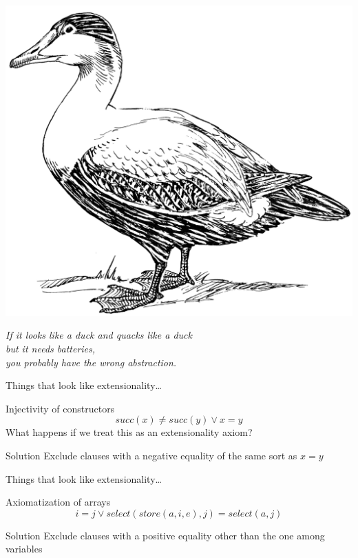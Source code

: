 \begin{frame}
  \begin{center}
    \includegraphics[width=.25\textwidth]{duck}
    
    \textit{If it looks like a duck and quacks like a duck\\ but it needs
    batteries,\\you probably have the wrong abstraction.}
  \end{center}
\end{frame}

\begin{frame}{Things that look like extensionality\dots}
  \begin{block}{Injectivity of constructors}
    \[
    succ(x) \neq succ(y) \lor x = y
    \]
    What happens if we treat this as an extensionality axiom?
  \end{block}
  
  \begin{block}{Solution}
    Exclude clauses with a negative equality of the same sort as $x = y$
  \end{block}
\end{frame}

\begin{frame}{Things that look like extensionality\dots}
  \begin{block}{Axiomatization of arrays}
    \[
    i = j \lor select(store(a,i,e), j) = select(a, j)
    \]
  \end{block}

  \begin{block}{Solution}
    Exclude clauses with a positive equality other than the one among
    variables
  \end{block}
\end{frame}
